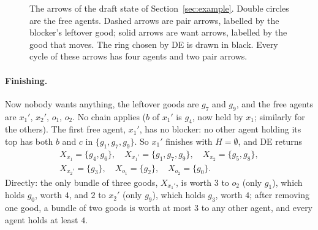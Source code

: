 \documentclass[runningheads,11pt]{llncs}
\newcommand{\DE}{\textup{DE}}
\begin{document}
\begin{figure}[tb]
\centering
{}
\caption{The arrows of the draft state of Section~\ref{sec:example}. Double circles are the free agents. Dashed arrows are pair arrows, labelled by the blocker's leftover good; solid arrows are want arrows, labelled by the good that moves. The ring chosen by \DE{} is drawn in black. Every cycle of these arrows has four agents and two pair arrows.}\label{fig:cycle}
\end{figure}

\paragraph{Finishing.} Now nobody wants anything, the leftover goods are $g_7$ and $g_9$, and the free agents are $x_1'$, $x_2'$, $o_1$, $o_2$. No chain applies ($b$ of $x_1'$ is $g_4$, now held by $x_1$; similarly for the others). The first free agent, $x_1'$, has no blocker: no other agent holding its top has both $b$ and $c$ in $\{g_1,g_7,g_9\}$. So $x_1'$ finishes with $H=\emptyset$, and \DE{} returns
\begin{gather*}
X_{x_1}=\{g_4,g_6\},\quad X_{x_1'}=\{g_1,g_7,g_9\},\quad X_{x_2}=\{g_5,g_8\},\\
X_{x_2'}=\{g_3\},\quad X_{o_1}=\{g_2\},\quad X_{o_2}=\{g_0\}.
\end{gather*}
Directly: the only bundle of three goods, $X_{x_1'}$, is worth $3$ to $o_2$ (only $g_1$), which holds $g_0$, worth $4$, and $2$ to $x_2'$ (only $g_9$), which holds $g_3$, worth $4$; after removing one good, a bundle of two goods is worth at most $3$ to any other agent, and every agent holds at least $4$.
\end{document}
